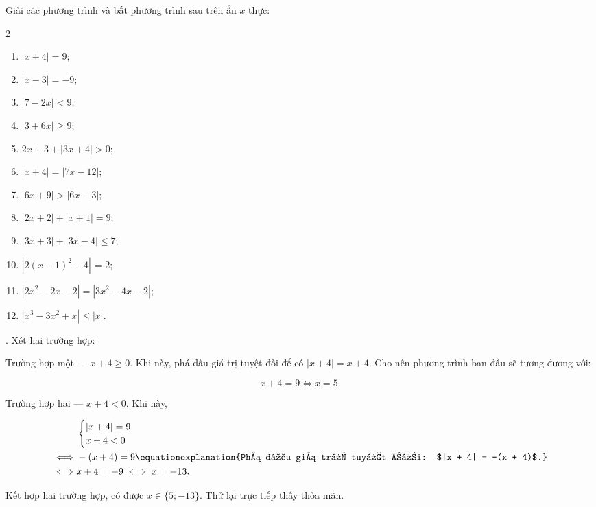 \exercise Giải các phương trình và bất phương trình sau trên ẩn $x$ thực:

\begin{multicols}{2}
   \begin{enumerate}
      \item $|x + 4| = 9$;
      \item $|x - 3| = -9$;
      \item $|7 - 2x| < 9$;
      \item $|3 + 6x| \geq 9$;
      \item $2x + 3 + |3x + 4| > 0$;
      \item $|x + 4| = |7x - 12|$;
      \item $|6x + 9| > |6x - 3|$;
      \item $\left|2x + 2\right| + |x + 1| = 9$;
      \item $|3x + 3| + |3x - 4| \leq 7$;
      \item $\left|2(x - 1)^2 - 4\right|$ = 2;
      \item $\left|2x^2 - 2x - 2\right| = \left|3x^2 - 4x - 2\right|$;
      \item $\left|x^3 - 3x^2 + x\right| \leq |x|$.
   \end{enumerate}
\end{multicols}

\solution

\setcounter{subexercise}{1}
. Xét hai trường hợp:

\textcolor{colorEmphasisCyan}{Trường hợp một --- $x + 4 \geq 0$}. Khi này, phá dấu giá trị tuyệt đối để có $|x + 4| = x + 4$. Cho nên phương trình ban đầu sẽ tương đương với:

\begin{equation*}
   x + 4 = 9 \iff x = 5.
\end{equation*}

\textcolor{colorEmphasis}{Trường hợp hai --- $x + 4 < 0$}. Khi này,

\begin{align*}
   &\begin{cases}
      |x + 4| = 9 \\
      x + 4 < 0
   \end{cases} \\
   \iff &-(x + 4) = 9 \equationexplanation{Phá dấu giá trị tuyệt đối: $|x + 4| = -(x + 4)$.}\\
   \iff &x + 4 = -9 \iff x = -13.
\end{align*}

Kết hợp hai trường hợp, có được $x \in \{5; -13\}$. Thử lại trực tiếp thấy thỏa mãn.

